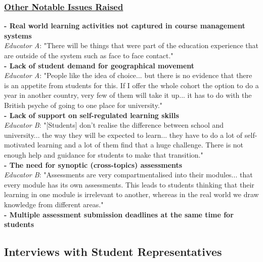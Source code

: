 \subsubsection{\underline{Other Notable Issues Raised}}

\textbf{- Real world learning activities not captured in course management systems}\\
\textit{Educator A}: "There will be things that were part of the education experience that are outside of the system
such as face to face contact."\vspace{0.25cm}\\
\textbf{- Lack of student demand for geographical movement}\\
\textit{Educator A}: "People like the idea of choice... but there is no evidence that there is an appetite 
from students for this. If I offer the whole cohort the option to do a year in another country,
very few of them will take it up... it has to do with the British psyche of going to one place for 
university."\vspace{0.25cm}\\
\textbf{- Lack of support on self-regulated learning skills}\\
\textit{Educator B}: "[Students] don't realise the difference between school and university... the way they will
be expected to learn... they have to do a lot of self-motivated learning and a lot of them find that a 
huge challenge. There is not enough help and guidance for students to make that transition."\vspace{0.25cm}\\
\textbf{- The need for synoptic (cross-topics) assessments}\\
\textit{Educator B}: "Assessments are very compartmentalised into their modules... that every module has 
its own assessments. This leads to students thinking that their learning in one module is irrelevant 
to another, whereas in the real world we draw knowledge from different areas."\vspace{0.25cm}\\
\textbf{- Multiple assessment submission deadlines at the same time for students}\\

\subsection{Interviews with Student Representatives}

